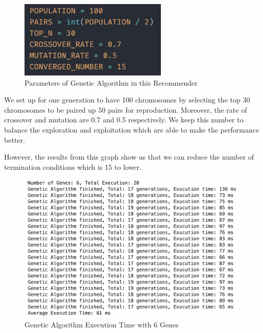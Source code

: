\documentclass[12pt,oneside,openright,a4paper]{cpe-english-project}
\begin{document}
\begin{figure}[H]\centering
\includegraphics[width=200pt]{./images/4ParametersofGeneticAlgorithminthisRecommender.png}
\caption{Parameters of Genetic Algorithm in this Recommender}\label{fig:4ParametersofGeneticAlgorithminthisRecommender}
\end{figure}\vspace{-24pt}

We set up for one generation to have 100 chromosomes by selecting the top 30 chromosomes to be paired up 50 pairs for reproduction. Moreover, the rate of crossover and mutation are 0.7 and 0.5 respectively. We keep this number to balance the exploration and exploitation which are able to make the performance better.

However, the results from this graph show us that we can reduce the number of termination conditions which is 15 to lower.

\begin{figure}[H]\centering
\includegraphics[width=350pt]{./images/4GeneticAlgorithmExecutionTimewith6Genes.png}
\caption{Genetic Algorithm Execution Time with 6 Genes}\label{fig:4GeneticAlgorithmExecutionTimewith6Genes}
\end{figure}\vspace{-24pt}
\end{document}
